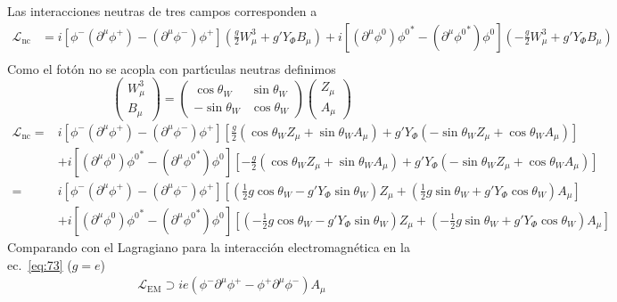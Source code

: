 Las interacciones neutras de tres campos corresponden a 
\begin{align}
  \mathcal{L}_\text{nc}&=i\left[\phi^- \left(\partial^\mu\phi^+\right)-\left(\partial^\mu\phi^-\right) \phi^+\right]\left(\frac{g}{2}W^3_\mu+g'Y_\Phi B_\mu\right)+i\left[\left(\partial^\mu\phi^0\right){\phi^0}^*-\left(\partial^\mu{\phi^0}^*\right)\phi^0\right]\left(-\frac{g}{2}W^3_\mu+g'Y_\Phi B_\mu\right)\nonumber\\
\end{align}
Como el fot\'on no se acopla con part\'\i culas neutras definimos
\begin{equation}
  \label{eq:81}
  \begin{pmatrix}
    W^3_\mu\\
    B_\mu
  \end{pmatrix}=
  \begin{pmatrix}
    \cos\theta_W&\sin\theta_W\\
    -\sin\theta_W&\cos\theta_W
  \end{pmatrix}
  \begin{pmatrix}
    Z_\mu\\
    A_\mu
  \end{pmatrix}
\end{equation}
\begin{align}
\label{eq:182}
  \mathcal{L}_\text{nc}=&i\left[\phi^- \left(\partial^\mu\phi^+\right)-\left(\partial^\mu\phi^-\right) \phi^+\right]\left[\frac{g}{2}(\cos\theta_WZ_\mu+\sin\theta_WA_\mu)+g'Y_\Phi(-\sin\theta_WZ_\mu+\cos\theta_WA_\mu)\right]\nonumber\\
&+i\left[\left(\partial^\mu\phi^0\right){\phi^0}^*-\left(\partial^\mu{\phi^0}^*\right)\phi^0\right]\left[-\frac{g}{2}(\cos\theta_WZ_\mu+\sin\theta_WA_\mu)+g'Y_\Phi(-\sin\theta_WZ_\mu+\cos\theta_WA_\mu)\right]\nonumber\\
=&i\left[\phi^- \left(\partial^\mu\phi^+\right)-\left(\partial^\mu\phi^-\right) \phi^+\right]
[(\tfrac{1}{2}g\cos\theta_W-g'Y_\Phi\sin\theta_W)Z_\mu+(\tfrac{1}{2}g\sin\theta_W+g'Y_\Phi\cos\theta_W)A_\mu]\nonumber\\
&+i\left[\left(\partial^\mu\phi^0\right){\phi^0}^*-\left(\partial^\mu{\phi^0}^*\right)\phi^0\right]
[(-\tfrac{1}{2}g\cos\theta_W-g'Y_\Phi\sin\theta_W)Z_\mu+(-\tfrac{1}{2}g\sin\theta_W+g'Y_\Phi\cos\theta_W)A_\mu]
\end{align}
Comparando con el Lagragiano para la interacci\'on electromagn\'etica en la ec.~\eqref{eq:73} ($g=e$)
\begin{align}
  \mathcal{L}_{\text{EM}}\supset ie(\phi^-\partial^\mu\phi^+-\phi^+\partial^\mu\phi^-)A_\mu
\end{align}
